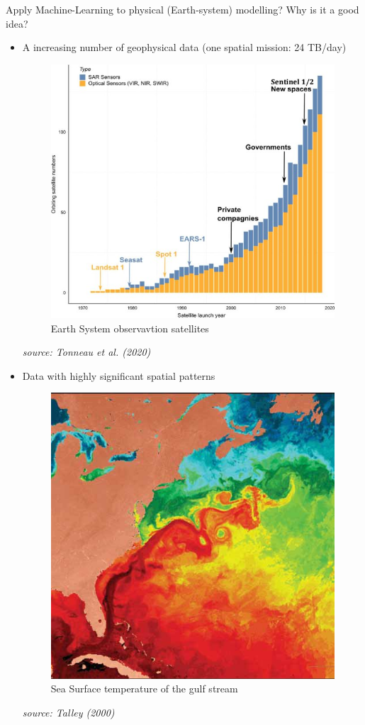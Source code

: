 \documentclass[handout, 10pt]{beamer}
\newcommand{\rref}[1][]{\hfill{\scriptsize\textit{#1}}}
\begin{document}
\begin{frame}{Apply Machine-Learning to physical (Earth-system) modelling?}
\alert{Why is it a good idea?}
    \begin{itemize}
        \item A increasing number of geophysical data (one spatial mission: 24 TB/day)
           {
        \begin{figure}
\includegraphics[width=.5\textwidth]{fig/L1/sat-eso.jpeg}
\caption*{Earth System observavtion satellites}
\end{figure}
\rref[source: Tonneau et al. (2020)]
}
        \item <2->Data with highly significant spatial patterns
                   {
        \begin{figure}
\includegraphics[width=.36\textwidth]{fig/L1/Satellite-image-of-sea-surface-temperature-showing-the-gulf-Stream-and-large-rings-and_W640.jpg}
\caption*{Sea Surface temperature of the gulf stream}
\end{figure}
\rref[source: Talley (2000)]
}
    \end{itemize}
\end{frame}
\end{document}
